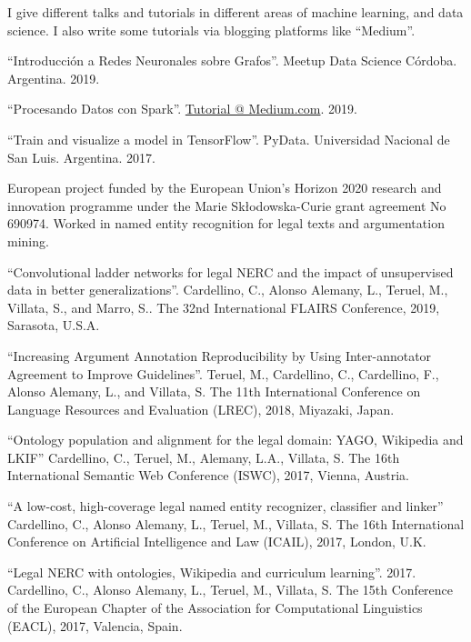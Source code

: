 \documentclass[]{deedy-resume-openfont}
\begin{document}
I give different talks and tutorials in different areas of machine learning,
and data science. I also write some tutorials via blogging platforms like ``Medium''.
\begin{tightemize}
\item ``Introducci\'on a Redes Neuronales sobre Grafos''. Meetup Data Science Córdoba. Argentina. 2019.
\item ``Procesando Datos con Spark''.
\href{https://medium.com/@crscardellino/procesando-datos-con-spark-48539d38e437}{Tutorial @ Medium.com}. 2019.
\item ``Train and visualize a model in TensorFlow''. PyData. Universidad 
Nacional de San Luis. Argentina. 2017.
\end{tightemize}
\sectionsep

European project funded by the European Union's Horizon 2020 research and 
innovation programme under the Marie Sk\l{}odowska-Curie grant agreement No 
690974. Worked in named entity recognition for legal texts and argumentation
mining.
\begin{tightemize}
\item ``Convolutional ladder networks for legal NERC and the impact of unsupervised data
in better generalizations''. Cardellino, C., Alonso Alemany, L., Teruel, M., Villata, S.,
and Marro, S.. The 32nd International FLAIRS Conference, 2019, Sarasota, U.S.A.
\item ``Increasing Argument Annotation Reproducibility by Using Inter-annotator
Agreement to Improve Guidelines''. Teruel, M., Cardellino, C., 
Cardellino, F., Alonso Alemany, L., and Villata, S. The 11th International 
Conference on Language Resources and Evaluation (LREC), 2018, Miyazaki, Japan.
\item ``Ontology population and alignment for the legal domain: YAGO, Wikipedia and LKIF''
Cardellino, C., Teruel, M., Alemany, L.A., Villata, S. The 16th International
Semantic Web Conference (ISWC), 2017, Vienna, Austria.
\item ``A low-cost, high-coverage legal named entity recognizer, classifier and linker''
Cardellino, C., Alonso Alemany, L., Teruel, M., Villata, S. The 16th International 
Conference on Artificial Intelligence and Law (ICAIL), 2017, London, U.K.
\item ``Legal NERC with ontologies, Wikipedia and curriculum learning''. 2017.
Cardellino, C., Alonso Alemany, L., Teruel, M., Villata, S. The 15th Conference of the 
European Chapter of the Association for Computational Linguistics (EACL), 2017,
Valencia, Spain.
\end{tightemize}
\sectionsep
\end{document}

